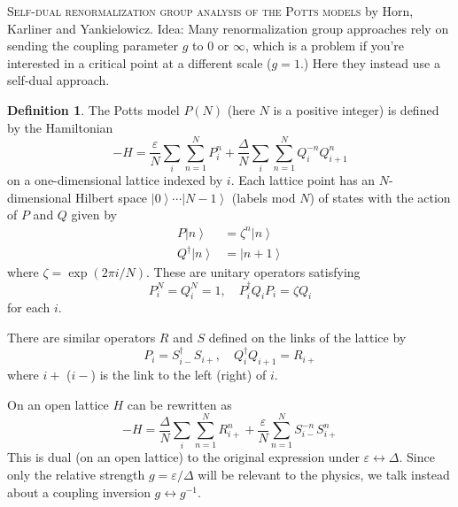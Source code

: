 \documentclass[11pt]{article}
\theoremstyle{definition}
\newtheorem{definition}{Definition}
\newcommand{\ket}[1]{\left | #1 \right \rangle}
\begin{document}
\textsc {Self-dual renormalization group analysis of the Potts models} by Horn, Karliner and Yankielowicz.
Idea: Many renormalization group approaches rely on sending the coupling parameter $g$ to $0$ or $\infty$, which is a problem if you're interested in a critical point at a different scale ($g = 1$.)
Here they instead use a self-dual approach.

\begin{definition}
The Potts model $P(N)$ (here $N$ is a positive integer) is defined by the Hamiltonian
\[
-H = \frac{\varepsilon}{N} \sum_i \sum_{n=1}^N P_i^n + \frac{\Delta}{N} \sum_i \sum_{n=1}^N Q_i^{-n} Q_{i+1}^n
\]
on a one-dimensional lattice indexed by $i$.
Each lattice point has an $N$-dimensional Hilbert space $\ket{0} \cdots \ket{N-1}$ (labels mod $N$) of states with the action of $P$ and $Q$ given by
\begin{align*}
P \ket n &= \zeta^n \ket n\\
Q^\dagger \ket n &= \ket{n+1}
\end{align*}
where $\zeta = \exp(2 \pi i /N)$.
These are unitary operators satisfying
\[
P^N_i = Q^N_i = 1, \quad P_i^\dagger Q_i P_i = \zeta Q_i
\]
for each $i$.
\end{definition}
There are similar operators $R$ and $S$ defined on the links of the lattice by
\[
P_i = S_{i-}^\dagger S_{i+}, \quad Q_i^\dagger Q_{i+1} = R_{i+}
\]
where $i+$ ($i-$) is the link to the left (right) of $i$.

On an open lattice $H$ can be rewritten as
\[
-H = \frac{\Delta}{N} \sum_i \sum_{n=1}^N R_{i+}^n + \frac{\varepsilon}{N} \sum_{n=1}^N S_{i-}^{-n} S_{i+}^n 
\]
This is dual (on an open lattice) to the original expression under $\varepsilon \leftrightarrow \Delta$.
Since only the relative strength $g = \varepsilon / \Delta$ will be relevant to the physics, we talk instead about a coupling inversion $g \leftrightarrow g^{-1}$.
\end{document}
